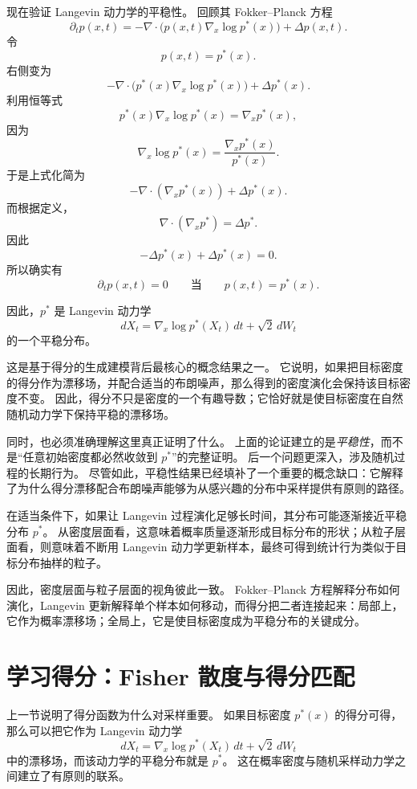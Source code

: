 现在验证 Langevin 动力学的平稳性。
回顾其 Fokker--Planck 方程
\[
\partial_t p(x,t)
=
-\nabla\cdot\bigl(p(x,t)\nabla_x \log p^\ast(x)\bigr)
+
\Delta p(x,t).
\]
令
\[
p(x,t)=p^\ast(x).
\]
右侧变为
\[
-\nabla\cdot\bigl(p^\ast(x)\nabla_x \log p^\ast(x)\bigr)
+
\Delta p^\ast(x).
\]
利用恒等式
\[
p^\ast(x)\nabla_x \log p^\ast(x)
=
\nabla_x p^\ast(x),
\]
因为
\[
\nabla_x \log p^\ast(x)
=
\frac{\nabla_x p^\ast(x)}{p^\ast(x)}.
\]
于是上式化简为
\[
-\nabla\cdot(\nabla_x p^\ast(x))
+
\Delta p^\ast(x).
\]
而根据定义，
\[
\nabla\cdot(\nabla_x p^\ast)
=
\Delta p^\ast.
\]
因此
\[
-\Delta p^\ast(x)+\Delta p^\ast(x)=0.
\]
所以确实有
\[
\boxed{
\partial_t p(x,t)=0
\qquad
\text{当}
\qquad
p(x,t)=p^\ast(x).
}
\]

因此，$p^\ast$ 是 Langevin 动力学
\[
\boxed{
dX_t
=
\nabla_x \log p^\ast(X_t)\,dt
+
\sqrt{2}\,dW_t
}
\]
的一个平稳分布。

这是基于得分的生成建模背后最核心的概念结果之一。
它说明，如果把目标密度的得分作为漂移场，并配合适当的布朗噪声，那么得到的密度演化会保持该目标密度不变。
因此，得分不只是密度的一个有趣导数；它恰好就是使目标密度在自然随机动力学下保持平稳的漂移场。

同时，也必须准确理解这里真正证明了什么。
上面的论证建立的是\emph{平稳性}，而不是“任意初始密度都必然收敛到 $p^\ast$”的完整证明。
后一个问题更深入，涉及随机过程的长期行为。
尽管如此，平稳性结果已经填补了一个重要的概念缺口：它解释了为什么得分漂移配合布朗噪声能够为从感兴趣的分布中采样提供有原则的路径。

在适当条件下，如果让 Langevin 过程演化足够长时间，其分布可能逐渐接近平稳分布 $p^\ast$。
从密度层面看，这意味着概率质量逐渐形成目标分布的形状；从粒子层面看，则意味着不断用 Langevin 动力学更新样本，最终可得到统计行为类似于目标分布抽样的粒子。

因此，密度层面与粒子层面的视角彼此一致。
Fokker--Planck 方程解释分布如何演化，Langevin 更新解释单个样本如何移动，而得分把二者连接起来：局部上，它作为概率漂移场；全局上，它是使目标密度成为平稳分布的关键成分。

\section{学习得分：Fisher 散度与得分匹配}

上一节说明了得分函数为什么对采样重要。
如果目标密度 $p^\ast(x)$ 的得分可得，那么可以把它作为 Langevin 动力学
\[
dX_t
=
\nabla_x \log p^\ast(X_t)\,dt
+
\sqrt{2}\,dW_t
\]
中的漂移场，而该动力学的平稳分布就是 $p^\ast$。
这在概率密度与随机采样动力学之间建立了有原则的联系。


